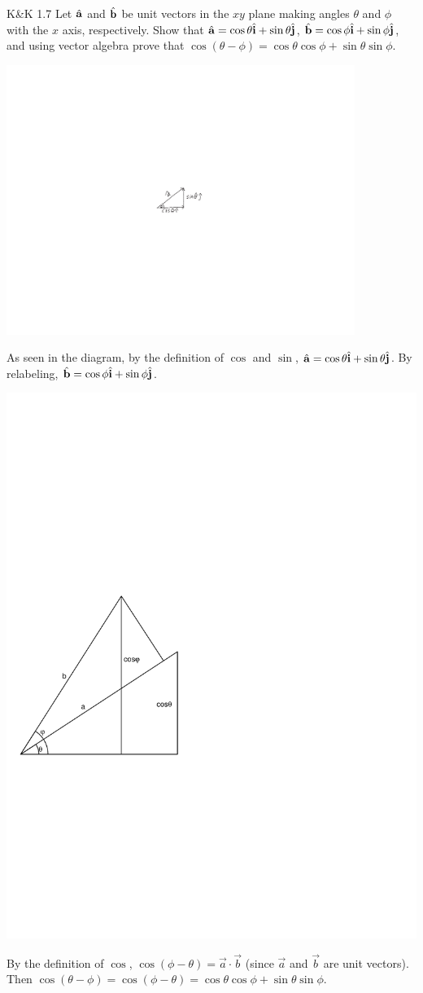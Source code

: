 \documentclass{esg8012pset}
\providecommand{\uvec}[1]{{\hat{\bf{#1}}}}
\begin{document}
\begin{problem}{K\&K 1.7}
  Let $\uvec a$ and $\uvec b$ be unit vectors in the $xy$ plane making angles $\theta$ and $\phi$ with the $x$ axis,
  respectively. Show that $\uvec a = \cos\theta\uvec i + \sin\theta\uvec j$, $\uvec b = \cos\phi\uvec i + \sin\phi\uvec j$, and using vector algebra prove
that $\cos(\theta -\phi ) = \cos\theta \cos\phi + \sin\theta \sin\phi$.
\end{problem}
\begin{solution}
  \includegraphics[width=0.85\textwidth]{ps01_Diagram_1}

  As seen in the diagram, by the definition of $\cos$ and $\sin$, $\uvec a = \cos\theta\uvec i + \sin\theta\uvec j$.  By relabeling, $\uvec b = \cos\phi\uvec i + \sin\phi\uvec j$.
  \begin{center}\includegraphics[width=.33\textwidth]{ps01_Diagram_2}\end{center}

  By the definition of $\cos$, $\cos(\phi - \theta) = \vec a \cdot \vec b$ (since $\vec a$ and $\vec b$ are unit vectors).  Then $\cos(\theta - \phi) = \cos(\phi - \theta) = \cos\theta\cos\phi + \sin\theta\sin\phi$.
\end{solution}
\end{document}
